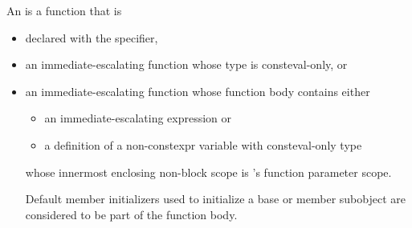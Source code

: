 \pnum
An  is a function that is
\begin{itemize}
\item
declared with the  specifier,
\item
an immediate-escalating function
whose type is consteval-only, or
\item
an immediate-escalating function 
whose function body contains either
\begin{itemize}
\item an immediate-escalating expression or
\item a definition of a non-constexpr variable with consteval-only type
\end{itemize}
whose innermost enclosing non-block scope
is 's function parameter scope.
\begin{tailnote}
Default member initializers used to initialize
a base or member subobject
are considered to be part of the function body.
\end{tailnote}
\end{itemize}

